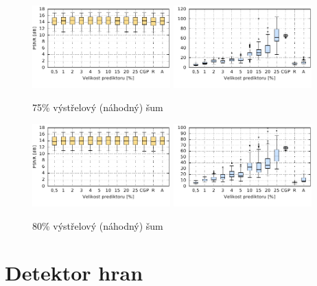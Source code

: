 \begin{figure}[H]
    \centering
    \includegraphics[width=0.475\textwidth]{fig/plot/compare/impulse75-100kg-psnrtest.pdf}
    \hskip0.5cm
    \includegraphics[width=0.475\textwidth]{fig/plot/compare/impulse75-100kg-usertime.pdf}
    \caption{75\% výstřelový (náhodný) šum}
\end{figure}

\begin{figure}[H]
    \centering
    \includegraphics[width=0.475\textwidth]{fig/plot/compare/impulse80-100kg-psnrtest.pdf}
    \hskip0.5cm
    \includegraphics[width=0.475\textwidth]{fig/plot/compare/impulse80-100kg-usertime.pdf}
    \caption{80\% výstřelový (náhodný) šum}
\end{figure}





\section{Detektor hran}

